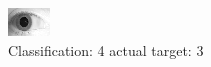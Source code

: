\begin{figure}[h!]
\begin{center}
\includegraphics[width=0.60\columnwidth]{figures/ID1955_class_4_target_3.png}
\end{center}
\caption{ Classification: 4 actual target: 3}
\label{fig:ID1955_class_4_target_3}
\end{figure}

